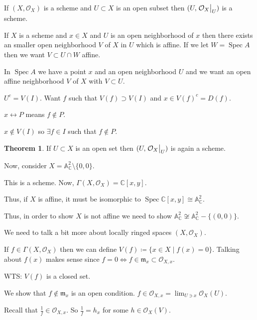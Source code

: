 \documentclass{article}
\theoremstyle{definition}
\newtheorem{theorem}{Theorem}
\begin{document}
    If \((X, \mathcal{O}_X)\) is a scheme and \(U \subset X\) is an open subset then \((U, \eval{\mathcal{O}_X}_U)\) is a scheme.

    If \(X\) is a scheme and \(x\in X\) and \(U\) is an open neighborhood of \(x\) then there exists an smaller open neighborhood \(V\) of \(X\) in \(U\) which is affine. If we let \(W = \operatorname{Spec} A\) then we want \(V \subset U \cap W\) affine.

    In \(\operatorname{Spec} A\) we have a point \(x\) and an open neighborhood \(U\) and we want an open affine neighborhood \(V\) of \(X\) with \(V \subset U\).

    \(U^c = V(I)\). Want \(f\) such that \(V(f) \supset V(I)\) and \(x\in V(f)^c = D(f)\).

    \(x \leftrightarrow P\) means \(f\notin P\).
    
    \(x\notin V(I)\) so \(\exists f\in I\) such that \(f\notin P\).

    \begin{theorem}
        If \(U \subset X\) is an open set then \((U, \eval{\mathcal{O}_X}_U)\) is again a scheme.
    \end{theorem}

    Now, consider \(X = \mathbb{A}_\mathbb{C}^2 \setminus \{ 0,0 \}\).

    This is a scheme. Now, \(\Gamma(X, \mathcal{O}_X) = \mathbb{C} [x,y]\).

    Thus, if \(X\) is affine, it must be isomorphic to \(\operatorname{Spec} \mathbb{C} [x,y] \cong \mathbb{A}^2_{\mathbb{C}}\).

    Thus, in order to show \(X\) is not affine we need to show \(\mathbb{A}^2_{\mathbb{C}} \not\cong \mathbb{A}^2_{\mathbb{C}} - \{(0,0) \}\).
    
    We need to talk a bit more about locally ringed spaces \((X,\mathcal{O}_X)\).

    If \(f\in \Gamma (X,\mathcal{O}_X)\) then we can define \(V(f) \coloneqq \{ x\in X \mid f(x) = 0 \}\). Talking about \(f(x)\) makes sense since \(f = 0 \iff f\in \mathfrak{m}_x \subset \mathcal{O}_{X,x}\).

    WTS: \(V(f)\) is a closed set.

    We show that \(f\notin \mathfrak{m}_x\) is an open condition. \(f\in \mathcal{O}_{X,x} = \lim_{U \ni x} \mathcal{O}_X(U) \).
    
    Recall that \(\frac{1}{f} \in \mathcal{O}_{X,x}\). So \(\frac{1}{f} = h_x\) for some \(h\in \mathcal{O}_X(V)\).
    
\end{document}
